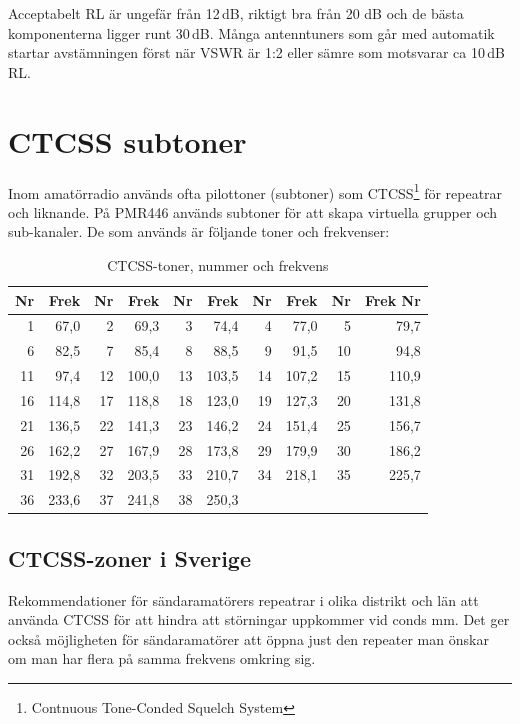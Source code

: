 Acceptabelt RL är ungefär från 12\,dB, riktigt bra från 20 dB och de bästa
komponenterna ligger runt 30\,dB. Många antenntuners som går med automatik
startar avstämningen först när VSWR är 1:2 eller sämre som motsvarar ca
10\,dB\,RL.

\section{CTCSS subtoner}

Inom amatörradio används ofta pilottoner (subtoner) som
CTCSS\footnote{Contnuous Tone-Conded Squelch System} för repeatrar och
liknande. På PMR446 används subtoner för att skapa virtuella grupper och
sub-kanaler. De som används är följande toner och frekvenser:

\begin{table}[H]
\centering
\begin{tabular}{rr|rr|rr|rr|rr}
\textbf{Nr} & \textbf{Frek} & \textbf{Nr} & \textbf{Frek} &\textbf{Nr} & \textbf{Frek} &\textbf{Nr} & \textbf{Frek} &\textbf{Nr} & \textbf{Frek} \textbf{Nr} \\ \hline
	 1 &  67,0 &  2 &  69,3 &  3 &  74,4 &  4 &  77,0 &  5 &  79,7 \\ \hline
	 6 &  82,5 &  7 &  85,4 &  8 &  88,5 &  9 &  91,5 & 10 &  94,8 \\ \hline
	11 &  97,4 & 12 & 100,0 & 13 & 103,5 & 14 & 107,2 & 15 & 110,9 \\ \hline
	16 & 114,8 & 17 & 118,8 & 18 & 123,0 & 19 & 127,3 & 20 & 131,8 \\ \hline
	21 & 136,5 & 22 & 141,3 & 23 & 146,2 & 24 & 151,4 & 25 & 156,7 \\ \hline
	26 & 162,2 & 27 & 167,9 & 28 & 173,8 & 29 & 179,9 & 30 & 186,2 \\ \hline
	31 & 192,8 & 32 & 203,5 & 33 & 210,7 & 34 & 218,1 & 35 & 225,7 \\ \hline
	36 & 233,6 & 37 & 241,8 & 38 & 250,3 &    &       &    &
\end{tabular}
\caption{CTCSS-toner, nummer och frekvens}
\end{table}

\subsection{CTCSS-zoner i Sverige}

Rekommendationer för sändaramatörers repeatrar i olika distrikt och län att
använda CTCSS för att hindra att störningar uppkommer vid conds mm. Det ger
också möjligheten för sändaramatörer att öppna just den repeater man önskar om
man har flera på samma frekvens omkring sig.

